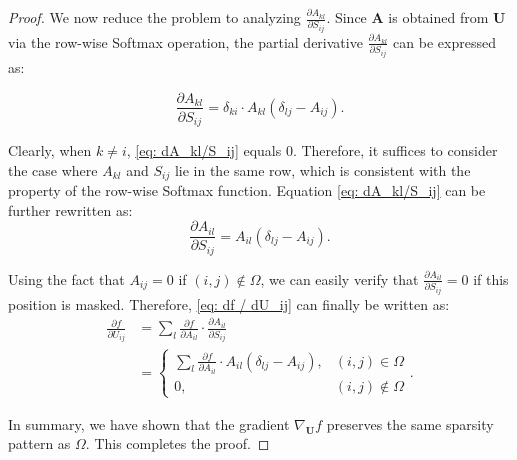 \documentclass[10pt,a4paper]{amsart}
\begin{document}
\begin{proof}
We now reduce the problem to analyzing $\frac{\partial A_{k l}}{\partial S_{i j}}$. Since $\mathbf{A}$ is obtained from $\mathbf{U}$ via the row-wise Softmax operation, the partial derivative $\frac{\partial A_{k l}}{\partial S_{i j}}$ can be expressed as:

\begin{equation}
    \frac{\partial A_{k l}}{\partial S_{i j}}=\delta_{k i} \cdot A_{k l}\left(\delta_{l j}-A_{i j}\right).
    \label{eq: dA_kl/S_ij}
\end{equation}

Clearly, when $k \neq i$, \eqref{eq: dA_kl/S_ij} equals 0. Therefore, it suffices to consider the case where $A_{k l}$ and $S_{i j}$ lie in the same row, which is consistent with the property of the row-wise Softmax function. Equation \eqref{eq: dA_kl/S_ij} can be further rewritten as:
\begin{equation}
    \frac{\partial A_{i l}}{\partial S_{i j}}= A_{i l}\left(\delta_{l j}-A_{i j}\right).
\end{equation}

Using the fact that $A_{i j}=0$ if $(i,j)\notin \Omega$, we can easily verify that $\frac{\partial A_{i l}}{\partial S_{i j}}=0$ if this position is masked. Therefore, \eqref{eq: df / dU_ij} can finally be written as:
\begin{equation}
    \begin{aligned}
        \frac{\partial f}{\partial U_{i j}} &= \sum_{l}\frac{\partial f}{\partial A_{il}} \cdot \frac{\partial A_{i l}}{\partial S_{i j}} \\
        &= \begin{cases}
            \sum_{l} \frac{\partial f}{\partial A_{il}}\cdot A_{i l}\left(\delta_{l j}-A_{i j}\right), & (i,j) \in \Omega \\
            0, & (i,j) \notin \Omega
        \end{cases}.
    \end{aligned}
\end{equation}

In summary, we have shown that the gradient $\nabla_{\mathbf{U}}f$ preserves the same sparsity pattern as $\Omega$. This completes the proof.

\end{proof}
\end{document}
